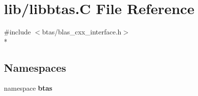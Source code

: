 \section{lib/libbtas.C File Reference}
\label{d4/d96/libbtas_8C}
{\ttfamily \#include $<$btas/blas\-\_\-cxx\-\_\-interface.\-h$>$}\\*
\subsection*{Namespaces}
\begin{DoxyCompactItemize}
\item 
namespace {\bf btas}
\end{DoxyCompactItemize}
